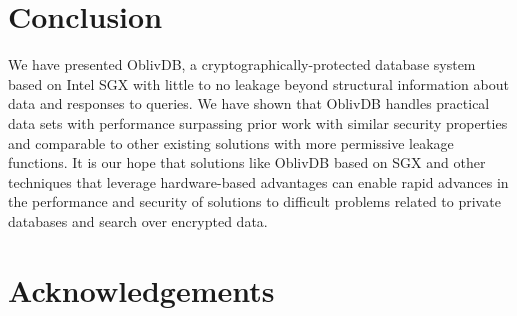 \documentclass[conference]{IEEEtran}
\def\name/{OblivDB}
\begin{document}
\section{Conclusion}\label{conclusion}
We have presented \name/, a cryptographically-protected database system based on Intel SGX with little to no leakage beyond structural information about data and responses to queries. We have shown that \name/ handles practical data sets with performance surpassing prior work with similar security properties and comparable to other existing solutions with more permissive leakage functions. It is our hope that solutions like \name/ based on SGX and other techniques that leverage hardware-based advantages can enable rapid advances in the performance and security of solutions to difficult problems related to private databases and search over encrypted data. 

\section*{Acknowledgements}





\end{document}
